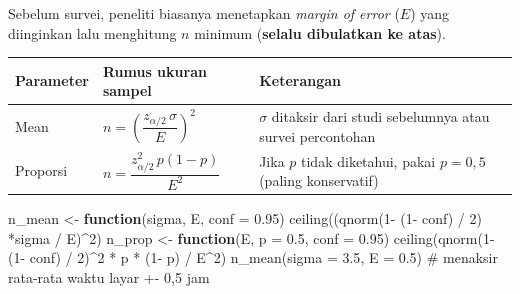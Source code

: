 \documentclass[
  indonesian,
  letterpaper,
]{book}
\newenvironment{Shaded}{\begin{snugshade}}{\end{snugshade}}
\newcommand{\AttributeTok}[1]{\textcolor[rgb]{0.40,0.45,0.13}{#1}}
\newcommand{\CommentTok}[1]{\textcolor[rgb]{0.37,0.37,0.37}{#1}}
\newcommand{\ControlFlowTok}[1]{\textcolor[rgb]{0.00,0.23,0.31}{\textbf{#1}}}
\newcommand{\DecValTok}[1]{\textcolor[rgb]{0.68,0.00,0.00}{#1}}
\newcommand{\FloatTok}[1]{\textcolor[rgb]{0.68,0.00,0.00}{#1}}
\newcommand{\FunctionTok}[1]{\textcolor[rgb]{0.28,0.35,0.67}{#1}}
\newcommand{\NormalTok}[1]{\textcolor[rgb]{0.00,0.23,0.31}{#1}}
\newcommand{\OtherTok}[1]{\textcolor[rgb]{0.00,0.23,0.31}{#1}}
\newcommand{\SpecialCharTok}[1]{\textcolor[rgb]{0.37,0.37,0.37}{#1}}
\newcounter{none} %
\begin{document}
Sebelum survei, peneliti biasanya menetapkan \emph{margin of error}
(\(E\)) yang diinginkan lalu menghitung \(n\) minimum (\textbf{selalu
dibulatkan ke atas}).

{\def\LTcaptype{none} %
\begin{longtable}[]{@{}
  >{\raggedright\arraybackslash}p{}
  >{\raggedright\arraybackslash}p{}
  >{\raggedright\arraybackslash}p{}@{}}
\toprule\noalign{}
\begin{minipage}[b]{\linewidth}\raggedright
Parameter
\end{minipage} & \begin{minipage}[b]{\linewidth}\raggedright
Rumus ukuran sampel
\end{minipage} & \begin{minipage}[b]{\linewidth}\raggedright
Keterangan
\end{minipage} \\
\midrule\noalign{}
\endhead
\bottomrule\noalign{}
\endlastfoot
Mean & \(n = \left(\dfrac{z_{\alpha/2}\,\sigma}{E}\right)^2\) &
\(\sigma\) ditaksir dari studi sebelumnya atau survei percontohan \\
Proporsi & \(n = \dfrac{z_{\alpha/2}^2\,p(1-p)}{E^2}\) & Jika \(p\)
tidak diketahui, pakai \(p = 0{,}5\) (paling konservatif) \\
\end{longtable}
}

\begin{Shaded}
\begin{Highlighting}[]
\NormalTok{n\_mean }\OtherTok{\textless{}{-}} \ControlFlowTok{function}\NormalTok{(sigma, E, }\AttributeTok{conf =} \FloatTok{0.95}\NormalTok{) }\FunctionTok{ceiling}\NormalTok{((}\FunctionTok{qnorm}\NormalTok{(}\DecValTok{1}\SpecialCharTok{{-}}\NormalTok{ (}\DecValTok{1}\SpecialCharTok{{-}}\NormalTok{ conf) }\SpecialCharTok{/} \DecValTok{2}\NormalTok{) }\SpecialCharTok{*}\NormalTok{sigma }\SpecialCharTok{/}\NormalTok{ E)}\SpecialCharTok{\^{}}\DecValTok{2}\NormalTok{)}
\NormalTok{n\_prop }\OtherTok{\textless{}{-}} \ControlFlowTok{function}\NormalTok{(E, }\AttributeTok{p =} \FloatTok{0.5}\NormalTok{, }\AttributeTok{conf =} \FloatTok{0.95}\NormalTok{) }\FunctionTok{ceiling}\NormalTok{(}\FunctionTok{qnorm}\NormalTok{(}\DecValTok{1}\SpecialCharTok{{-}}\NormalTok{ (}\DecValTok{1}\SpecialCharTok{{-}}\NormalTok{ conf) }\SpecialCharTok{/} \DecValTok{2}\NormalTok{)}\SpecialCharTok{\^{}}\DecValTok{2} \SpecialCharTok{*}
\NormalTok{p }\SpecialCharTok{*}\NormalTok{ (}\DecValTok{1}\SpecialCharTok{{-}}\NormalTok{ p) }\SpecialCharTok{/}\NormalTok{ E}\SpecialCharTok{\^{}}\DecValTok{2}\NormalTok{)}
\FunctionTok{n\_mean}\NormalTok{(}\AttributeTok{sigma =} \FloatTok{3.5}\NormalTok{, }\AttributeTok{E =} \FloatTok{0.5}\NormalTok{) }\CommentTok{\# menaksir rata{-}rata waktu layar +{-} 0,5 jam}
\end{Highlighting}
\end{Shaded}
\end{document}
